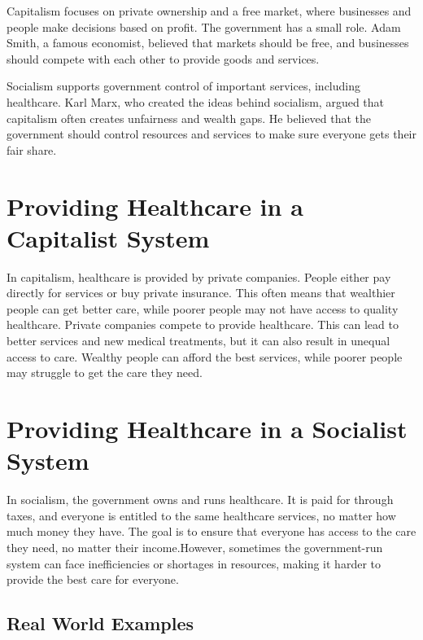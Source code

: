 \documentclass[conference]{IEEEtran}
\begin{document}
\par
Capitalism focuses on private ownership and a free market, 
where businesses and people make decisions based on profit. 
The government has a small role. Adam Smith, a famous economist, 
believed that markets should be free, and businesses should compete 
with each other to provide goods and services.

\par
Socialism supports government control of important services, 
including healthcare. Karl Marx, who created the ideas behind socialism, 
argued that capitalism often creates unfairness and wealth gaps. 
He believed that the government should control resources and 
services to make sure everyone gets their fair share.

\section{Providing Healthcare in a Capitalist System}

\par
In capitalism, healthcare is provided by private companies. 
People either pay directly for services or buy private insurance. 
This often means that wealthier people can get better care, 
while poorer people may not have access to quality healthcare.
Private companies compete to provide healthcare. 
This can lead to better services and new medical treatments, 
but it can also result in unequal access to care. 
Wealthy people can afford the best services, 
while poorer people may struggle to get the care they need.

\section{Providing Healthcare in a Socialist System}

\par
In socialism, the government owns and runs healthcare. 
It is paid for through taxes, and everyone is entitled to the same 
healthcare services, no matter how much money they have. 
The goal is to ensure that everyone has access to the care they need, 
no matter their income.However, sometimes the government-run 
system can face inefficiencies or shortages in resources, 
making it harder to provide the best care for everyone.

\subsection{Real World Examples}
\end{document}
